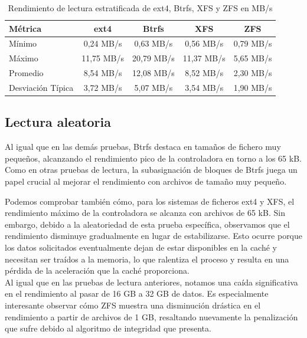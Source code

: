 \begin{table}[h!]
\centering
\caption{Rendimiento de lectura estratificada de ext4, Btrfs, XFS y ZFS en MB/s}
\begin{tabular}{|l|c|c|c|c|}
\hline
\textbf{Métrica} & \textbf{ext4} & \textbf{Btrfs} & \textbf{XFS} & \textbf{ZFS} \\ \hline
Mínimo           & 0,24 MB/s     & 0,63 MB/s      & 0,56 MB/s    & 0,79 MB/s \\ \hline
Máximo           & 11,75 MB/s    & 20,79 MB/s     & 11,37 MB/s   & 5,65 MB/s \\ \hline
Promedio         & 8,54 MB/s     & 12,08 MB/s     & 8,52 MB/s    & 2,30 MB/s \\ \hline
Desviación Típica & 3,72 MB/s     & 5,07 MB/s      & 3,54 MB/s    & 1,90 MB/s \\ \hline
\end{tabular}
\label{tab:rendimiento_lectura_estratificada_sistemas_archivos}
\end{table}

\subsection{Lectura aleatoria}

Al igual que en las demás pruebas, Btrfs destaca en tamaños de fichero muy pequeños, alcanzando el rendimiento pico de la controladora en torno a los 65 kB. Como en otras pruebas de lectura, la subasignación de bloques de Btrfs juega un papel crucial al mejorar el rendimiento con archivos de tamaño muy pequeño.

Podemos comprobar también cómo, para los sistemas de ficheros ext4 y XFS, el rendimiento máximo de la controladora se alcanza con archivos de 65 kB. Sin embargo, debido a la aleatoriedad de esta prueba específica, observamos que el rendimiento disminuye gradualmente en lugar de estabilizarse. Esto ocurre porque los datos solicitados eventualmente dejan de estar disponibles en la caché y necesitan ser traídos a la memoria, lo que ralentiza el proceso y resulta en una pérdida de la aceleración que la caché proporciona. \\

Al igual que en las pruebas de lectura anteriores, notamos una caída significativa en el rendimiento al pasar de 16 GB a 32 GB de datos. Es especialmente interesante observar cómo ZFS muestra una disminución drástica en el rendimiento a partir de archivos de 1 GB, resaltando nuevamente la penalización que sufre debido al algoritmo de integridad que presenta. \\

